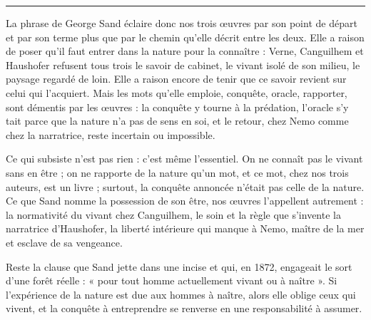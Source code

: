 \documentclass[11pt,a4paper]{article}
\begin{document}
\begin{center}\rule{0.5\linewidth}{0.5pt}\end{center}

La phrase de George Sand éclaire donc nos trois œuvres par son point de départ et par son terme plus que par le chemin qu'elle décrit entre les deux. Elle a raison de poser qu'il faut entrer dans la nature pour la connaître : Verne, Canguilhem et Haushofer refusent tous trois le savoir de cabinet, le vivant isolé de son milieu, le paysage regardé de loin. Elle a raison encore de tenir que ce savoir revient sur celui qui l'acquiert. Mais les mots qu'elle emploie, conquête, oracle, rapporter, sont démentis par les œuvres : la conquête y tourne à la prédation, l'oracle s'y tait parce que la nature n'a pas de sens en soi, et le retour, chez Nemo comme chez la narratrice, reste incertain ou impossible.

Ce qui subsiste n'est pas rien : c'est même l'essentiel. On ne connaît pas le vivant sans en être ; on ne rapporte de la nature qu'un mot, et ce mot, chez nos trois auteurs, est un livre ; surtout, la conquête annoncée n'était pas celle de la nature. Ce que Sand nomme la possession de son être, nos œuvres l'appellent autrement : la normativité du vivant chez Canguilhem, le soin et la règle que s'invente la narratrice d'Haushofer, la liberté intérieure qui manque à Nemo, maître de la mer et esclave de sa vengeance.

Reste la clause que Sand jette dans une incise et qui, en 1872, engageait le sort d'une forêt réelle : « pour tout homme actuellement vivant ou à naître ». Si l'expérience de la nature est due aux hommes à naître, alors elle oblige ceux qui vivent, et la conquête à entreprendre se renverse en une responsabilité à assumer.
\end{document}
